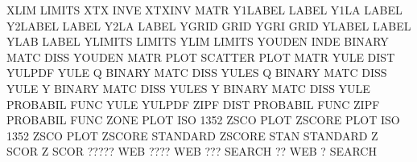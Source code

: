 XLIM                                    LIMITS
XTX      INVE                           XTXINV   MATR
Y1LABEL                                 LABEL
Y1LA                                    LABEL
Y2LABEL                                 LABEL
Y2LA                                    LABEL
YGRID                                   GRID
YGRI                                    GRID
YLABEL                                  LABEL
YLAB                                    LABEL
YLIMITS                                 LIMITS
YLIM                                    LIMITS
YOUDEN   INDE                           BINARY   MATC DISS
YOUDEN   MATR PLOT                      SCATTER  PLOT MATR
YULE     DIST                           YULPDF
YULE     Q                              BINARY   MATC DISS
YULES    Q                              BINARY   MATC DISS
YULE     Y                              BINARY   MATC DISS
YULES    Y                              BINARY   MATC DISS
YULE                                    PROBABIL FUNC
YULE                                    YULPDF
ZIPF     DIST                           PROBABIL FUNC
ZIPF                                    PROBABIL FUNC
ZONE     PLOT                           ISO      1352 ZSCO PLOT
ZSCORE   PLOT                           ISO      1352 ZSCO PLOT
ZSCORE                                  STANDARD
ZSCORE   STAN                           STANDARD
Z        SCOR                           Z        SCOR
?????                                   WEB
????                                    WEB
???                                     SEARCH
??                                      WEB
?                                       SEARCH
